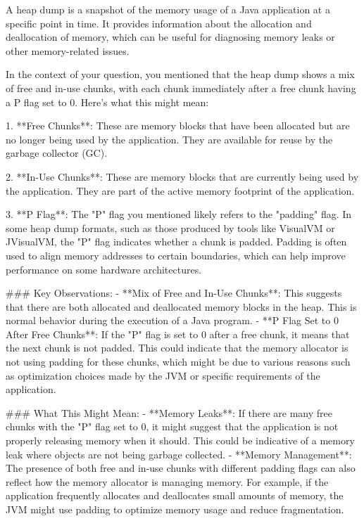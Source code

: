 A heap dump is a snapshot of the memory usage of a Java application at a specific point in time. It provides information about the allocation and deallocation of memory, which can be useful for diagnosing memory leaks or other memory-related issues.

In the context of your question, you mentioned that the heap dump shows a mix of free and in-use chunks, with each chunk immediately after a free chunk having a P flag set to 0. Here's what this might mean:

1. **Free Chunks**: These are memory blocks that have been allocated but are no longer being used by the application. They are available for reuse by the garbage collector (GC).

2. **In-Use Chunks**: These are memory blocks that are currently being used by the application. They are part of the active memory footprint of the application.

3. **P Flag**: The "P" flag you mentioned likely refers to the "padding" flag. In some heap dump formats, such as those produced by tools like VisualVM or JVisualVM, the "P" flag indicates whether a chunk is padded. Padding is often used to align memory addresses to certain boundaries, which can help improve performance on some hardware architectures.

### Key Observations:
- **Mix of Free and In-Use Chunks**: This suggests that there are both allocated and deallocated memory blocks in the heap. This is normal behavior during the execution of a Java program.
- **P Flag Set to 0 After Free Chunks**: If the "P" flag is set to 0 after a free chunk, it means that the next chunk is not padded. This could indicate that the memory allocator is not using padding for these chunks, which might be due to various reasons such as optimization choices made by the JVM or specific requirements of the application.

### What This Might Mean:
- **Memory Leaks**: If there are many free chunks with the "P" flag set to 0, it might suggest that the application is not properly releasing memory when it should. This could be indicative of a memory leak where objects are not being garbage collected.
- **Memory Management**: The presence of both free and in-use chunks with different padding flags can also reflect how the memory allocator is managing memory. For example, if the application frequently allocates and deallocates small amounts of memory, the JVM might use padding to optimize memory usage and reduce fragmentation.

